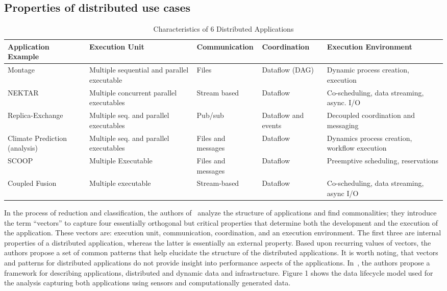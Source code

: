 \documentclass{acm_proc_article-sp}
\begin{document}
\subsection{Properties of distributed use cases}
\begin{table}
\centering
\caption{Characteristics of 6 Distributed Applications}
\label{Table4}
\begin{tabular}{|p{2cm}|p{2cm}|p{3cm}|p{2cm}|p{3cm}|} \hline
\textbf{Application Example} & \textbf{Execution Unit} & \textbf{Communication} & \textbf{Coordination} & \textbf{Execution Environment} \\ \hline
Montage & Multiple sequential and parallel executable & Files & Dataflow (DAG) & Dynamic process creation, execution \\ \hline
NEKTAR  & Multiple concurrent parallel executables & Stream based & Dataflow & Co-scheduling, data streaming, async. I/O \\ \hline
Replica-Exchange & Multiple seq. and parallel executables & Pub/sub & Dataflow and events & Decoupled coordination and messaging \\ \hline
Climate Prediction (analysis)& Multiple seq. and parallel executables & Files and messages & Dataflow & Dynamics process creation, workflow execution \\ \hline
SCOOP & Multiple Executable & Files and messages & Dataflow & Preemptive scheduling, reservations \\ \hline
Coupled Fusion & Multiple executable & Stream-based & Dataflow & Co-scheduling, data streaming, async I/O
\\ \hline
\end{tabular}
\end{table}

In the process of reduction and classification, the authors of~\cite{b28,b26} analyze the structure of applications and find commonalities; they introduce the term ``vectors'' to capture four essentially orthogonal but critical properties that determine both the development and the execution of the application. These vectors are: execution unit, communication, coordination, and an execution environment. The first three are internal properties of a distributed application, whereas the latter is essentially an external property. Based upon recurring values of vectors, the authors propose a set of common patterns that help elucidate the structure of the distributed applications. It is worth noting, that vectors and patterns for distributed applications do not provide insight into performance aspects of the applications. In~\cite{b28}, the authors propose a framework for describing applications, distributed and dynamic data and infrastructure. Figure 1 shows the data lifecycle model used for the analysis capturing both applications using sensors and computationally generated data.
\end{document}

